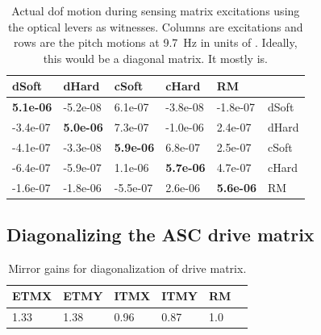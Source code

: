\begin{table}
\centering
\caption{Actual dof motion during sensing matrix excitations using the
  optical levers as witnesses. Columns are excitations and rows are
  the pitch motions at 9.7~Hz in units of \microrad. Ideally, this
  would be a diagonal matrix. It mostly is.}
\begin{tabular}{l l l l l l}
\hline
dSoft & dHard  & cSoft & cHard & RM & \\
\hline
   \textbf{5.1e-06} & -5.2e-08  & 6.1e-07 & -3.8e-08 &  -1.8e-07 & dSoft\\
  -3.4e-07 &  \textbf{5.0e-06}  &  7.3e-07 & -1.0e-06 &  2.4e-07 & dHard\\
  -4.1e-07 & -3.3e-08 &  \textbf{5.9e-06} &  6.8e-07 &  2.5e-07 & cSoft\\
  -6.4e-07 & -5.9e-07 &  1.1e-06 &  \textbf{5.7e-06} &  4.7e-07 & cHard\\
  -1.6e-07 & -1.8e-06 & -5.5e-07 &   2.6e-06 &  \textbf{5.6e-06} & RM\\
\hline
\end{tabular}
\label{table:excitations_calibrated}
\end{table}





\subsection{Diagonalizing the ASC drive matrix}

\begin{table}
\centering
\caption[Mirror gains for diagonalization of drive matrix]{Mirror gains for diagonalization of drive matrix.}
\begin{tabular}{l l l l l l}
\hline
ETMX & ETMY & ITMX & ITMY & RM & \\
\hline
1.33 & 1.38 & 0.96 & 0.87 & 1.0 \\
\hline
\end{tabular}
\end{table}








